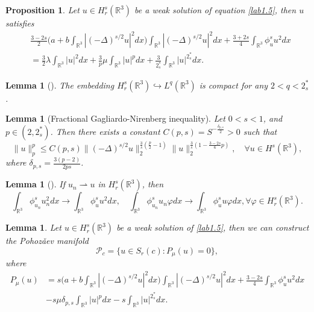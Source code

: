 \documentclass[10pt,a4paper]{amsart}
\numberwithin{equation}{section}
\newtheorem{lemma}[theorem]{Lemma}
\newtheorem{proposition}[theorem]{Proposition}
\begin{document}
\begin{proposition}\label{pro2.2}
Let $u\in H^s_r(\mathbb{R}^3)$ be a weak solution of equation  \eqref{lab1.5},
then $u$ satisfies
\begin{align*}
&\frac{3-2s}{2}\Big(a+b\int_{\mathbb{R}^3}|(-\Delta)^{s/2}u|^2dx\Big)
 \int_{\mathbb{R}^3}|(-\Delta)^{s/2}u|^2dx
 +\frac{3+2s}{4}\int_{\mathbb{R}^3}\phi^s_u u^2dx\\
&=\frac{3}{2}\lambda \int_{\mathbb{R}^3}|u|^2dx
 +\frac{3}{p}\mu \int_{\mathbb{R}^3}|u|^pdx
 +\frac{3}{2^*_s}\int_{\mathbb{R}^3}|u|^{2^*_s}dx.
\end{align*}
\end{proposition}

\begin{lemma}[\cite{D1688}] \label{lem2.1311}
The embedding $H^s_r(\mathbb{R}^3)\hookrightarrow L^q(\mathbb{R}^3)$ is compact for
 any $2< q < 2^*_s$.
\end{lemma}

\begin{lemma}[Fractional Gagliardo-Nirenberg inequality] \label{lem3.2}
Let $0<s<1$, and $p\in(2, 2^*_s)$. Then there exists a constant
$C(p,s)=S^{-\frac{\delta_{p,s}}{2}}>0$ such that
\begin{equation}\label{3.2}
\|u\|^p_p\leq C(p,s)\|(-\Delta)^{s/2}u\|^{\frac{3}{s}(\frac{p}{2}-1)}_2
\|u\|^{\frac{3}{s}(1-\frac{3-2s}{6}p)}_2, \quad \forall u\in H^s(\mathbb{R}^3),
\end{equation}
where $\delta_{p,s}=\frac{3(p-2)}{2ps}$.
\end{lemma}

\begin{lemma}[\cite{D1678}] \label{lem2.171}
If $u_n\rightharpoonup u$ in $H^s_r(\mathbb{R}^3)$, then
\[
\int_{\mathbb{R}^3}\phi^s_{u_n}u^2_ndx\to \int_{\mathbb{R}^3}\phi^s_{u}u^2dx,\quad
\int_{\mathbb{R}^3}\phi^s_{u_n}u_n\varphi dx\to \int_{\mathbb{R}^3}\phi^s_{u}u\varphi dx, \forall \varphi\in H^s_r(\mathbb{R}^3).
\]
\end{lemma}

\begin{lemma}\label{lem3.5}
Let $u\in H^s_r(\mathbb{R}^3)$ be a weak solution of  \eqref{lab1.5},
then we can construct the Pohoz\v{a}ev manifold
$$
\mathcal{P}_c= \{u\in S_r(c) : P_\mu(u)=0 \},
$$
where
\begin{align*}
P_\mu(u)
&=s\Big(a+b\int_{\mathbb{R}^3}|(-\Delta)^{s/2}u|^2dx\Big)
 \int_{\mathbb{R}^3}|(-\Delta)^{s/2}u|^2dx
  +\frac{3-2s}{4}\int_{\mathbb{R}^3}\phi^s_u u^2dx\\
&-s\mu \delta_{p,s}\int_{\mathbb{R}^3}|u|^pdx-s\int_{\mathbb{R}^3}|u|^{2^*_s}dx.
\end{align*}
\end{lemma}
\end{document}
